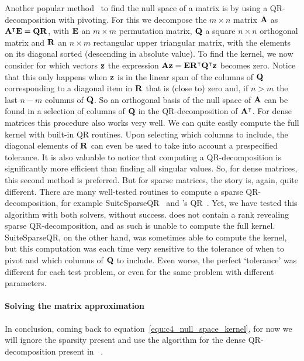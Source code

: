 Another popular method~\cite{trefethen_numerical_1997} to find the null space of a matrix is by using a QR-decomposition with pivoting. For this we decompose the $m \times n$ matrix $\vb{A}$ as ${\vb{A}}^\intercal\vb{E} = \vb{Q} \vb{R}$, with $\vb{E}$ an $m\times m$ permutation matrix, $\vb{Q}$ a square $n \times n$ orthogonal matrix and $\vb{R}$ an $n \times m$ rectangular upper triangular matrix, with the elements on its diagonal sorted (descending in absolute value). To find the kernel, we now consider for which vectors $\vb{z}$ the expression $\vb{A} \vb{z} = \vb{E}{\vb{R}}^\intercal{\vb{Q}}^\intercal\vb{z}$ becomes zero. Notice that this only happens when $\vb{z}$ is in the linear span of the columns of $\vb{Q}$ corresponding to a diagonal item in $\vb{R}$ that is (close to) zero and, if $n > m$ the last $n - m$ columns of $\vb{Q}$. So an orthogonal basis of the null space of $\vb{A}$ can be found in a selection of columns of $\vb{Q}$ in the QR-decomposition of ${\vb{A}}^\intercal$. For dense matrices this procedure also works very well. We can quite easily compute the full kernel with built-in QR routines. Upon selecting which columns to include, the diagonal elements of $\vb{R}$ can even be used to take into account a prespecified tolerance. It is also valuable to notice that computing a QR-decomposition is significantly more efficient than finding all singular values. So, for dense matrices, this second method is preferred. But for sparse matrices, the story is, again, quite different. There are many well-tested routines to compute a sparse QR-decomposition, for example SuiteSparseQR~\cite{davis_algorithm_2011} and \Eigen{}'s QR~\cite{guennebaud_eigen_2010}. Yet, we have tested this algorithm with both solvers, without success. \Eigen{} does not contain a rank revealing sparse QR-decomposition, and as such is unable to compute the full kernel. SuiteSparseQR, on the other hand, was sometimes able to compute the kernel, but this computation was each time very sensitive to the tolerance of when to pivot and which columns of $\vb{Q}$ to include. Even worse, the perfect `tolerance' was different for each test problem, or even for the same problem with different parameters.

\paragraph{Solving the matrix approximation}
In conclusion, coming back to equation~\eqref{equ:c4_null_space_kernel}, for now we will ignore the sparsity present and use the algorithm for the dense QR-decomposition present in \Eigen{}~\cite{guennebaud_eigen_2010}.

